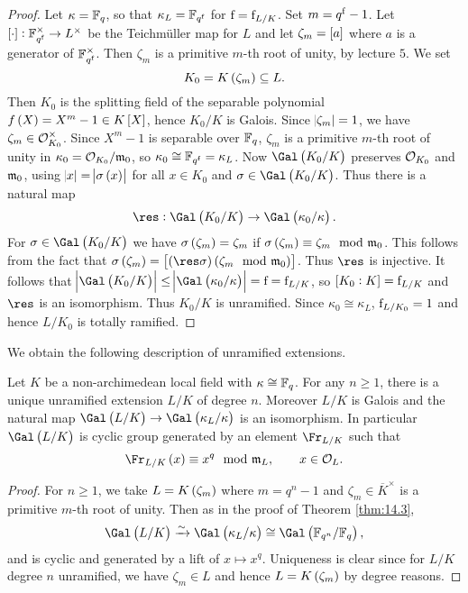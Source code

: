 \begin{proof}
Let $ \kappa = \mathbb{F}_q $, so that $ \kappa_L = \mathbb{F}_{q^{\mathrm{f}}} $ for $ \mathrm{f} = \mathrm{f}_{L / K} $. Set $ m = q^{\mathrm{f}} - 1 $. Let $ \sbr{\cdot} : \FF_{q^\f}^\times \to L^\times $ be the Teichm\"uller map for $ L $ and let $ \zeta_m = \sbr{a} $ where $ a $ is a generator of $ \mathbb{F}_{q^{\mathrm{f}}}^\times $. Then $ \zeta_m $ is a primitive $ m $-th root of unity, by lecture $ 5 $. We set
$$ K_0 = K\br{\zeta_m} \subseteq L. $$
Then $ K_0 $ is the splitting field of the separable polynomial $ f\br{X} = X^m - 1 \in K\sbr{X} $, hence $ K_0 / K $ is Galois. Since $ \abs{\zeta_m} = 1 $, we have $ \zeta_m \in \mathcal{O}_{K_0}^\times $. Since $ X^m - 1 $ is separable over $ \mathbb{F}_q $, $ \zeta_m $ is a primitive $ m $-th root of unity in $ \kappa_0 = \mathcal{O}_{K_0} / \mathfrak{m}_0 $, so $ \kappa_0 \cong \mathbb{F}_{q^{\mathrm{f}}} = \kappa_L $. Now $ \Gal\br{K_0 / K} $ preserves $ \mathcal{O}_{K_0} $ and $ \mathfrak{m}_0 $, using $ \abs{x} = \abs{\sigma\br{x}} $ for all $ x \in K_0 $ and $ \sigma \in \Gal\br{K_0 / K} $. Thus there is a natural map
$$ \res : \Gal\br{K_0 / K} \to \Gal\br{\kappa_0 / \kappa}. $$
For $ \sigma \in \Gal\br{K_0 / K} $ we have $ \sigma\br{\zeta_m} = \zeta_m $ if $ \sigma\br{\zeta_m} \equiv \zeta_m \mod \mmm_0 $. This follows from the fact that $ \sigma\br{\zeta_m} = \sbr{\br{\res \sigma}\br{\zeta_m \mod \mmm_0}} $. Thus $ \res $ is injective. It follows that $ \abs{\Gal\br{K_0 / K}} \le \abs{\Gal\br{\kappa_0 / \kappa}} = \f = \f_{L / K} $, so $ \sbr{K_0 : K} = \f_{L / K} $ and $ \res $ is an isomorphism. Thus $ K_0 / K $ is unramified. Since $ \kappa_0 \cong \kappa_L $, $ \mathrm{f}_{L / K_0} = 1 $ and hence $ L / K_0 $ is totally ramified.
\end{proof}

We obtain the following description of unramified extensions.

\begin{theorem}
\label{thm:14.4}
Let $ K $ be a non-archimedean local field with $ \kappa \cong \mathbb{F}_q $. For any $ n \ge 1 $, there is a unique unramified extension $ L / K $ of degree $ n $. Moreover $ L / K $ is Galois and the natural map $ \Gal\br{L / K} \to \Gal\br{\kappa_L / \kappa} $ is an isomorphism. In particular $ \Gal\br{L / K} $ is cyclic group generated by an element $ \Fr_{L / K} $ such that
$$ \Fr_{L / K}\br{x} \equiv x^q \mod \mmm_L, \qquad x \in \OOO_L. $$
\end{theorem}

\pagebreak

\begin{proof}
For $ n \ge 1 $, we take $ L = K\br{\zeta_m} $ where $ m = q^n - 1 $ and $ \zeta_m \in \overline{K}^\times $ is a primitive $ m $-th root of unity. Then as in the proof of Theorem \ref{thm:14.3},
$$ \Gal\br{L / K} \xrightarrow{\sim} \Gal\br{\kappa_L / \kappa} \cong \Gal\br{\FF_{q^n} / \FF_q}, $$
and is cyclic and generated by a lift of $ x \mapsto x^q $. Uniqueness is clear since for $ L / K $ degree $ n $ unramified, we have $ \zeta_m \in L $ and hence $ L = K\br{\zeta_m} $ by degree reasons.
\end{proof}

